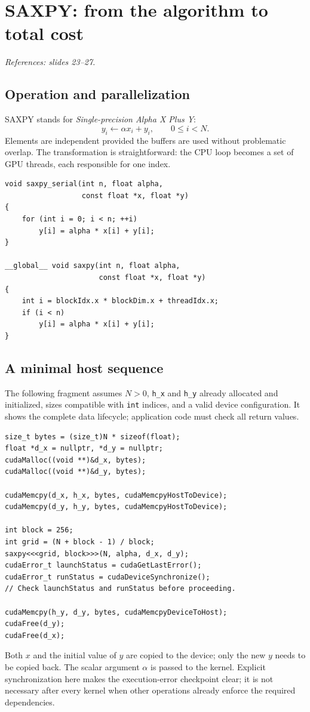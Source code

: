 \documentclass[11pt,a4paper]{article}
\let\originalsection\section
\renewcommand{\section}{\Needspace{7\baselineskip}\originalsection}
\let\originalsubsection\subsection
\renewcommand{\subsection}{\Needspace{5\baselineskip}\originalsubsection}
\newcommand{\src}[1]{\par{\small\color{accent}\textit{References: #1.}}\par}
\begin{document}
\section{SAXPY: from the algorithm to total cost}
\src{slides 23--27}
\subsection{Operation and parallelization}
SAXPY stands for \emph{Single-precision Alpha X Plus Y}:
\begin{equation}\boxed{y_i\leftarrow\alpha x_i+y_i,\qquad 0\leq i<N.}\end{equation}
Elements are independent provided the buffers are used without problematic
overlap. The transformation is straightforward: the CPU loop becomes a
set of GPU threads, each responsible for one index.

\begin{lstlisting}
void saxpy_serial(int n, float alpha,
                  const float *x, float *y)
{
    for (int i = 0; i < n; ++i)
        y[i] = alpha * x[i] + y[i];
}

__global__ void saxpy(int n, float alpha,
                      const float *x, float *y)
{
    int i = blockIdx.x * blockDim.x + threadIdx.x;
    if (i < n)
        y[i] = alpha * x[i] + y[i];
}
\end{lstlisting}

\subsection{A minimal host sequence}
The following fragment assumes $N>0$, \texttt{h\_x} and \texttt{h\_y}
already allocated and initialized, sizes compatible with \texttt{int}
indices, and a valid device configuration. It shows the complete data
lifecycle; application code must check all return values.

\begin{lstlisting}
size_t bytes = (size_t)N * sizeof(float);
float *d_x = nullptr, *d_y = nullptr;
cudaMalloc((void **)&d_x, bytes);
cudaMalloc((void **)&d_y, bytes);

cudaMemcpy(d_x, h_x, bytes, cudaMemcpyHostToDevice);
cudaMemcpy(d_y, h_y, bytes, cudaMemcpyHostToDevice);

int block = 256;
int grid = (N + block - 1) / block;
saxpy<<<grid, block>>>(N, alpha, d_x, d_y);
cudaError_t launchStatus = cudaGetLastError();
cudaError_t runStatus = cudaDeviceSynchronize();
// Check launchStatus and runStatus before proceeding.

cudaMemcpy(h_y, d_y, bytes, cudaMemcpyDeviceToHost);
cudaFree(d_y);
cudaFree(d_x);
\end{lstlisting}
Both $x$ and the initial value of $y$ are copied to the device; only the
new $y$ needs to be copied back. The scalar argument $\alpha$ is passed
to the kernel. Explicit synchronization here makes the execution-error
checkpoint clear; it is not necessary after every kernel when other
operations already enforce the required dependencies.
\end{document}
